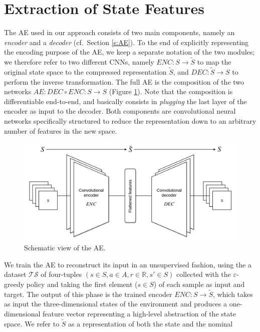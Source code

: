\section{Extraction of State Features}
The AE used in our approach consists of two main components, namely an 
\textit{encoder} and a \textit{decoder} (cf.\ Section \ref{s:AE}). To the end of 
explicitly representing the encoding purpose of the AE, we keep a separate 
notation of the two modules; we therefore refer to two different CNNs, namely 
$ENC: S \rightarrow \tilde{S}$ to map the original state space to the 
compressed representation $\tilde{S}$, and $DEC: \tilde{S} \rightarrow S$ 
to perform the inverse transformation. The full AE is the composition of the
two networks $AE: DEC \circ ENC: S \rightarrow S$ (Figure \ref{f:ae}). 
Note that the composition is differentiable end-to-end, and basically consists 
in \textit{plugging} the last layer of the encoder as input to the decoder. 
Both components are convolutional neural networks specifically structured to 
reduce the representation down to an arbitrary number of features in the new 
space.
%
\begin{figure}
\includegraphics[width=\textwidth]{pictures/conv_autoencoder}
\centering
\caption[Schematic view of the AE]{Schematic view of the AE.}
\label{f:ae}
\end{figure}
%
We train the AE to reconstruct its input in an unsupervised fashion, using the a
dataset $\mathcal{TS}$ of four-tuples $(s \in S, a \in A, r \in \mathbb{R}, s' \in S)$ 
collected with the $\varepsilon$-greedy policy and taking the first element ($s \in S$) 
of each sample as input and target. 
The output of this phase is the trained encoder $ENC: S \rightarrow \tilde{S}$, 
which takes as input the three-dimensional states of the environment and 
produces a one-dimensional feature vector representing a high-level abstraction 
of the state space.
We refer to $\tilde{S}$ as a representation of both the state and the nominal 
